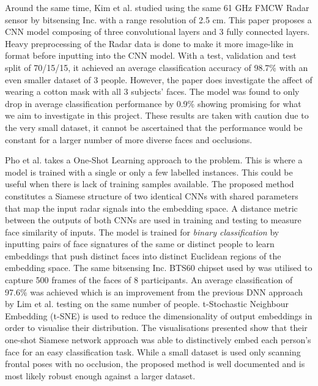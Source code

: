 \documentclass{interim}
\begin{document}
Around the same time, Kim et al. \cite{kim2020face} studied using the same 61 GHz FMCW Radar sensor by bitsensing Inc. with a range resolution of 2.5 cm. This paper proposes a CNN model composing of three convolutional layers and 3 fully connected layers. Heavy preprocessing of the Radar data is done to make it more image-like in format before inputting into the CNN model. With a test, validation and test split of 70/15/15, it achieved an average classification accuracy of 98.7\% with an even smaller dataset of 3 people. However, the paper does investigate the affect of wearing a cotton mask with all 3 subjects' faces. The model was found to only drop in average classification performance by 0.9\% showing promising for what we aim to investigate in this project. These results are taken with caution due to the very small dataset, it cannot be ascertained that the performance would be constant for a larger number of more diverse faces and occlusions.

Pho et al. \cite{pho2021radar} takes a One-Shot Learning approach to the problem. This is where a model is trained with a single or only a few labelled instances. This could be useful when there is lack of training samples available. The proposed method constitutes a Siamese structure of two identical CNNs with shared parameters that map the input radar signals into the embedding space. A distance metric between the outputs of both CNNs are used in training and testing to measure face similarity of inputs. The model is trained for \textit{binary classification} by inputting pairs of face signatures of the same or distinct people to learn embeddings that push distinct faces into distinct Euclidean regions of the embedding space. The same bitsensing Inc. BTS60 chipset used by \cite{lim2020dnn, kim2020face} was utilised to capture 500 frames of the faces of 8 participants. An average classification of 97.6\% was achieved which is an improvement from the previous DNN approach by Lim et al. \cite{lim2020dnn} testing on the same number of people. t-Stochastic Neighbour Embedding (t-SNE) \cite{van2008visualizing} is used to reduce the dimensionality of output embeddings in order to visualise their distribution. The visualisations presented show that their one-shot Siamese network approach was able to distinctively embed each person's face for an easy classification task. While a small dataset is used only scanning frontal poses with no occlusion, the proposed method is well documented and is most likely robust enough against a larger dataset.
\end{document}
